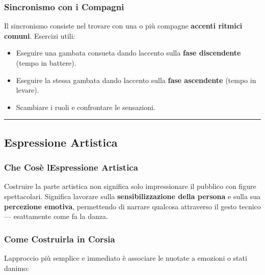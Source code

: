 \documentclass[a4paper,11pt]{article}
\providecommand{\tightlist}{%
  \setlength{\itemsep}{0pt}\setlength{\parskip}{0pt}}
\begin{document}
\subsubsection{Sincronismo con i
      Compagni}\label{sincronismo-con-i-compagni}

Il sincronismo consiste nel trovare con una o più compagne
\textbf{accenti ritmici comuni}. Esercizi utili:

\begin{itemize}
      \tightlist
      \item
            Eseguire una gambata consueta dando l\textquotesingle accento sulla
            \textbf{fase discendente} (tempo in battere).
      \item
            Eseguire la stessa gambata dando l\textquotesingle accento sulla
            \textbf{fase ascendente} (tempo in levare).
      \item
            Scambiare i ruoli e confrontare le sensazioni.
\end{itemize}

\begin{center}\rule{0.5\linewidth}{0.5pt}\end{center}

\subsection{Espressione Artistica}\label{espressione-artistica}

\subsubsection{Che Cos\textquotesingle è l\textquotesingle Espressione
      Artistica}\label{che-cosuxe8-lespressione-artistica}

Costruire la parte artistica non significa solo impressionare il
pubblico con figure spettacolari. Significa lavorare sulla
\textbf{sensibilizzazione della persona} e sulla sua \textbf{percezione
      emotiva}, permettendo di narrare qualcosa attraverso il gesto tecnico
--- esattamente come fa la danza.

\subsubsection{Come Costruirla in
      Corsia}\label{come-costruirla-in-corsia}

L\textquotesingle approccio più semplice e immediato è associare le
nuotate a emozioni o stati d\textquotesingle animo:
\end{document}
